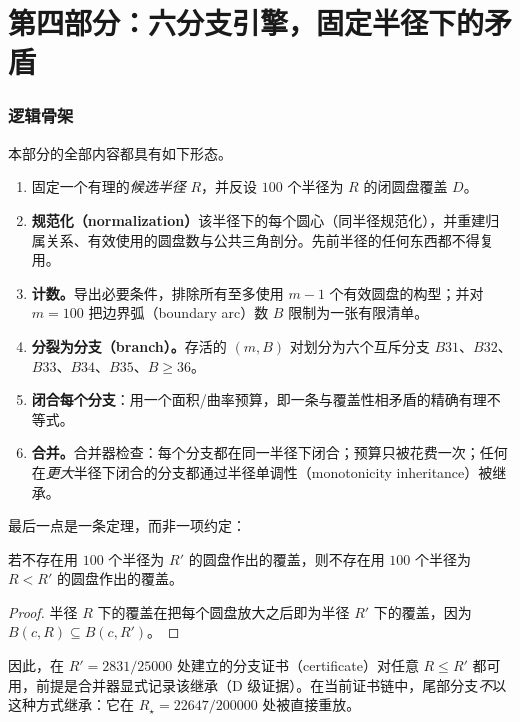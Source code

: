 \part*{第四部分：六分支引擎，固定半径下的矛盾}
\setcounter{section}{0}

\section{逻辑骨架}

本部分的全部内容都具有如下形态。

\begin{enumerate}[leftmargin=1.6em,itemsep=3pt]
\item 固定一个有理的\emph{候选半径} $R$，并反设 $100$ 个半径为 $R$ 的闭圆盘覆盖 $D$。
\item \textbf{规范化（normalization）}该半径下的每个圆心（同半径规范化），并重建归属关系、有效使用的圆盘数与公共三角剖分。先前半径的任何东西都不得复用。
\item \textbf{计数。}导出必要条件，排除所有至多使用 $m-1$ 个有效圆盘的构型；并对 $m=100$ 把边界弧（boundary arc）数 $B$ 限制为一张有限清单。
\item \textbf{分裂为分支（branch）。}存活的 $(m,B)$ 对划分为六个互斥分支 $B31$、$B32$、$B33$、$B34$、$B35$、$B{\ge}36$。
\item \textbf{闭合每个分支}：用一个面积/曲率预算，即一条与覆盖性相矛盾的精确有理不等式。
\item \textbf{合并。}合并器检查：每个分支都在同一半径下闭合；预算只被花费一次；任何在\emph{更大}半径下闭合的分支都通过半径单调性（monotonicity inheritance）被继承。
\end{enumerate}

最后一点是一条定理，而非一项约定：

\begin{lemma}[半径单调性]\label{lem:monotone}
若不存在用 $100$ 个半径为 $R'$ 的圆盘作出的覆盖，则不存在用 $100$ 个半径为 $R<R'$ 的圆盘作出的覆盖。
\end{lemma}
\begin{proof}
半径 $R$ 下的覆盖在把每个圆盘放大之后即为半径 $R'$ 下的覆盖，因为 $B(c,R)\subseteq B(c,R')$。
\end{proof}

因此，在 $R'=2831/25000$ 处建立的分支证书（certificate）对任意 $R\le R'$ 都可用，前提是合并器显式记录该继承（D 级证据）。在当前证书链中，尾部分支\emph{不}以这种方式继承：它在 $R_\star=22647/200000$ 处被直接重放。

